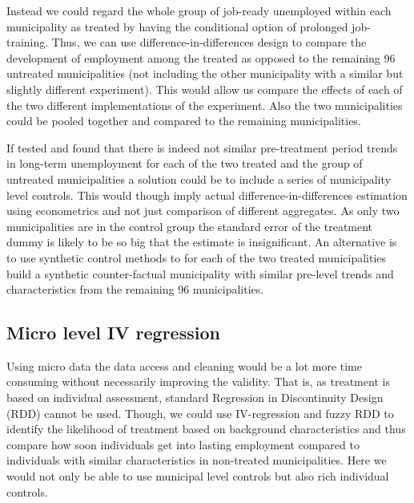 Instead we could regard the whole group of job-ready unemployed within each municipality as treated by having the conditional option of prolonged job-training. Thus, we can use difference-in-differences design to compare the development of employment among the treated as opposed to the remaining 96 untreated municipalities (not including the other municipality with a similar but slightly different experiment). This would allow us compare the effects of each of the two different implementations of the experiment. Also the two municipalities could be pooled together and compared to the remaining municipalities.

If tested and found that there is indeed not similar pre-treatment period trends in long-term unemployment for each of the two treated and the group of untreated municipalities a solution could be to include a series of municipality level controls. This would though imply actual difference-in-differences estimation using econometrics and not just comparison of different aggregates. As only two municipalities are in the control group the standard error of the treatment dummy is likely to be so big that the estimate is insignificant. An alternative is to use synthetic control methods to for each of the two treated municipalities build a synthetic counter-factual municipality with similar pre-level trends and characteristics from the remaining 96 municipalities.

\subsection{Micro level IV regression}
Using micro data the data access and cleaning would be a lot more time consuming without necessarily improving the validity. That is, as treatment is based on individual assessment, standard Regression in Discontinuity Design (RDD) cannot be used. Though, we could use IV-regression and fuzzy RDD to identify the likelihood of treatment based on background characteristics and thus compare how soon individuals get into lasting employment compared to individuals with similar characteristics in non-treated municipalities. Here we would not only be able to use municipal level controls but also rich individual controls.
